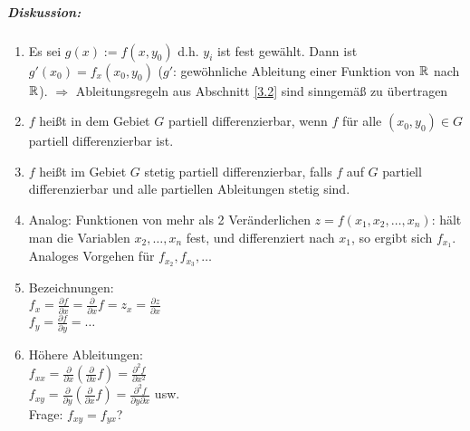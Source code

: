 \subparagraph{Diskussion:} 
\begin{enumerate}
\item Es sei $g(x):= f(x,y_0)$ d.h. $y_i$ ist fest gewählt. Dann ist $g'(x_0)=f_x(x_0,y_0)$ ($g'$: gewöhnliche Ableitung einer Funktion von $\mathbb{R}$ nach $\mathbb{R}$). $\Rightarrow$ Ableitungsregeln aus Abschnitt \ref{3.2} sind sinngemäß zu übertragen
\item $f$ heißt in dem Gebiet $G$ partiell differenzierbar, wenn $f$ für alle $(x_0, y_0) \in G$ partiell differenzierbar ist.
\item $f$ heißt im Gebiet $G$ stetig partiell differenzierbar, falls $f$ auf $G$ partiell differenzierbar und alle partiellen Ableitungen stetig sind.
\item Analog: Funktionen von mehr als 2 Veränderlichen $z=f(x_1 ,x_2, \dots, x_n)$: hält man die Variablen $x_2, \dots, x_n$ fest, und differenziert nach $x_1$, so ergibt sich $f_{x_1}$. Analoges Vorgehen für $f_{x_2}, f_{x_3}, \dots$
\item Bezeichnungen:\\
$f_x=\frac{\partial f}{\partial x}=\frac{\partial}{\partial x}f = z_x=\frac{\partial z}{\partial x}$\\
$f_y=\frac{\partial f}{\partial y}=\dots$
\item Höhere Ableitungen:\\
$f_{xx}=\frac{\partial}{\partial x} \left( \frac{\partial}{\partial x}f\right) = \frac{\partial^2 f}{\partial x^2}$\\
$f_{xy}=\frac{\partial}{\partial y}\left(\frac{\partial}{\partial x}f\right) = \frac{\partial^2 f}{\partial y \partial x}$ usw.\\
Frage: $f_{xy}=f_{yx}$?
\end{enumerate}
